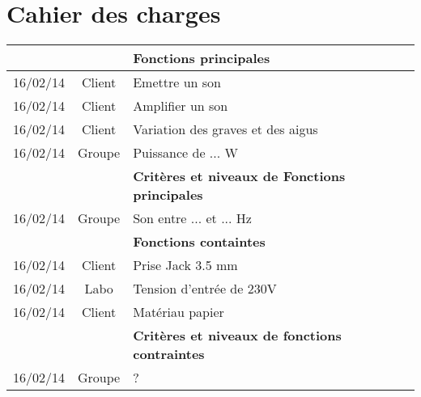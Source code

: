 
\section{Cahier des charges}

\begin{table*} [h]
	
		\begin{tabular}{|l|c|l|}
		\hline
			 & & \textbf{Fonctions principales} \\
		\hline
			16/02/14 & Client & Emettre un son \\
			16/02/14 & Client & Amplifier un son \\
			16/02/14 & Client & Variation des graves et des aigus \\
			16/02/14 & Groupe & Puissance de ... W \\
		\hline
			 & & \textbf{Critères et niveaux de Fonctions principales} \\
		\hline
			16/02/14 & Groupe & Son entre ... et ... Hz \\
		\hline
			 & & \textbf{Fonctions containtes} \\
		\hline
			16/02/14 & Client & Prise Jack 3.5 mm \\
			16/02/14 & Labo & Tension d'entrée de 230V \\
			16/02/14 & Client & Matériau papier \\
		\hline
			 & & \textbf{Critères et niveaux de fonctions contraintes} \\
		\hline
			16/02/14 & Groupe & ? \\
		\hline
		\end{tabular}
		
\end{table*}